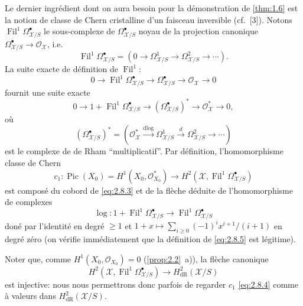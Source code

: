 \documentclass[12pt,a4paper]{article}
\theoremstyle{plain}
\theoremstyle{definition}
\theoremstyle{remark}
\DeclareMathOperator{\Pic}{Pic}
\DeclareMathOperator{\Fil}{Fil}
\newcommand{\dlog}{\mathrm{dlog}}
\begin{document}
Le dernier ingrédient dont on aura besoin pour la démonstration de \ref{thm:1.6} est la notion de classe de Chern cristalline d'un faisceau inversible (cf.~[3]). Notons $\Fil^1 \Omega^{\bullet}_{\mathcal{X}/S}$ le sous-complexe de $\Omega^{\bullet}_{\mathcal{X}/S}$ noyau de la projection canonique $\Omega^{\bullet}_{\mathcal{X}/S} \to \mathcal{O}_{\mathcal{X}}$, i.e.
\[
\Fil^1 \Omega^{\bullet}_{\mathcal{X}/S} = (0 \to \Omega^1_{\mathcal{X}/S} \to \Omega^2_{\mathcal{X}/S} \to \cdots).
\]
La suite exacte de définition de $\Fil^1$:
\begin{equation}\label{eq:2.8.2}
0 \to \Fil^1 \Omega^{\bullet}_{\mathcal{X}/S} \to \Omega^{\bullet}_{\mathcal{X}/S} \to \mathcal{O}_{\mathcal{X}} \to 0
\end{equation}
fournit une suite exacte
\begin{equation}\label{eq:2.8.3}
0 \to 1 + \Fil^1 \Omega^{\bullet}_{\mathcal{X}/S} \to (\Omega^{\bullet}_{\mathcal{X}/S})^* \to \mathcal{O}_{\mathcal{X}}^* \to 0,
\end{equation}
où
\[
(\Omega^{\bullet}_{\mathcal{X}/S})^* = (\mathcal{O}_{\mathcal{X}}^* \xrightarrow{\dlog} \Omega^1_{\mathcal{X}/S} \xrightarrow{d} \Omega^2_{\mathcal{X}/S} \to \cdots)
\]
est le complexe de de Rham ``multiplicatif''. Par définition, l'homomorphisme classe de Chern
\begin{equation}\label{eq:2.8.4}
c_1: \Pic(X_0) = H^1(X_0, \mathcal{O}_{X_0}^*) \to H^2(\mathcal{X}, \Fil^1 \Omega^{\bullet}_{\mathcal{X}/S})
\end{equation}
est composé du cobord de \eqref{eq:2.8.3} et de la flèche déduite de l'homomorphisme de complexes
\begin{equation}\label{eq:2.8.5}
\log: 1 + \Fil^1 \Omega^{\bullet}_{\mathcal{X}/S} \to \Fil^1 \Omega^{\bullet}_{\mathcal{X}/S}
\end{equation}
doné par l'identité en degré $\geqslant 1$ et $1+x \mapsto \sum_{i \geqslant 0} (-1)^i x^{i+1}/(i+1)$ en degré zéro (on vérifie immédiatement que la définition de \eqref{eq:2.8.5} est légitime).

Noter que, comme $H^1(X_0, \mathcal{O}_{X_0}) = 0$ (\ref{prop:2.2}~a)), la flèche canonique
\begin{equation}\label{eq:2.8.6}
H^2(\mathcal{X}, \Fil^1 \Omega^{\bullet}_{\mathcal{X}/S}) \to H^2_{\mathrm{dR}}(\mathcal{X}/S)
\end{equation}
est injective: nous nous permettrons donc parfois de regarder $c_1$ \eqref{eq:2.8.4} comme à valeurs dans $H^2_{\mathrm{dR}}(\mathcal{X}/S)$.
\end{document}
